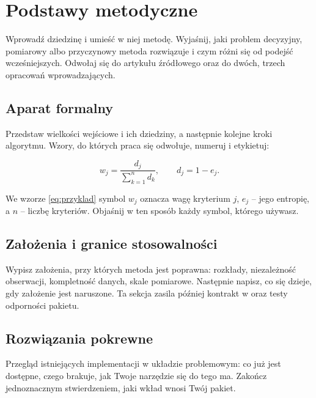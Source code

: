 \chapter{Podstawy metodyczne}

%

Wprowadź dziedzinę i umieść w niej metodę. Wyjaśnij, jaki problem decyzyjny, pomiarowy albo przyczynowy metoda rozwiązuje i czym różni się od podejść wcześniejszych. Odwołaj się do artykułu źródłowego oraz do dwóch, trzech opracowań wprowadzających.

\section{Aparat formalny}

Przedstaw wielkości wejściowe i ich dziedziny, a następnie kolejne kroki algorytmu. Wzory, do których praca się odwołuje, numeruj i etykietuj:

\begin{equation}\label{eq:przyklad}
  w_j = \frac{d_j}{\sum_{k=1}^{n} d_k}, \qquad d_j = 1 - e_j.
\end{equation}

We wzorze \eqref{eq:przyklad} symbol $w_j$ oznacza wagę kryterium $j$, $e_j$ – jego entropię, a $n$ – liczbę kryteriów. Objaśnij w ten sposób każdy symbol, którego używasz.

\section{Założenia i granice stosowalności}

Wypisz założenia, przy których metoda jest poprawna: rozkłady, niezależność obserwacji, kompletność danych, skale pomiarowe. Następnie napisz, co się dzieje, gdy założenie jest naruszone. Ta sekcja zasila później kontrakt w  oraz testy odporności pakietu.

\section{Rozwiązania pokrewne}

Przegląd istniejących implementacji w układzie problemowym: co już jest dostępne, czego brakuje, jak Twoje narzędzie się do tego ma. Zakończ jednoznacznym stwierdzeniem, jaki wkład wnosi Twój pakiet.
